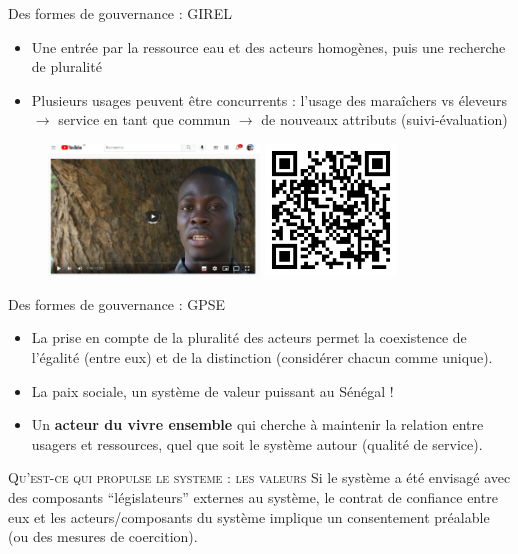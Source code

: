 \documentclass[newPxFont]{beamer}
\begin{document}
\begin{frame}[c]{Des formes de gouvernance : GIREL}
      \vspace{-1cm}
      \begin{itemize}
          \item Une entrée par la ressource eau et des acteurs homogènes, puis une recherche de pluralité
          \item Plusieurs usages peuvent être concurrents : l’usage des maraîchers vs éleveurs $\rightarrow$ service en tant que commun $\rightarrow$ de nouveaux attributs (suivi-évaluation)
      \end{itemize}
      \begin{figure}
          \includegraphics[height=3.5cm]{img/ComMod_f'eauDiem.png}
          \includegraphics[height=3.5cm]{img/qrcode_feaudiem.png}
      \end{figure}
\end{frame}

\begin{frame}[c]{Des formes de gouvernance : GPSE}
    \vspace{-1cm}
      \begin{itemize}
          \item La prise en compte de la pluralité des acteurs permet la coexistence de l’égalité (entre eux) et de la distinction (considérer chacun comme unique).
          \item La paix sociale, un système de valeur puissant au Sénégal !
          \item Un \textbf{acteur du vivre ensemble} qui cherche à maintenir la relation entre usagers et ressources, quel que soit le système autour (qualité de service).
      \end{itemize}
       \small{
         \begin{alertblock}{\textsc{Qu'est-ce qui propulse le systeme : les valeurs }}
          Si le système a été envisagé avec des composants “législateurs” externes au système, le contrat de confiance entre eux et les acteurs/composants du système implique un consentement préalable (ou des mesures de coercition).
         \end{alertblock}
       }
\end{frame}
\end{document}

